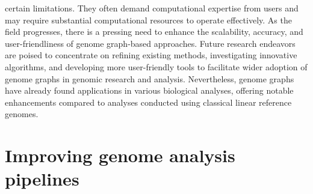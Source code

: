 \documentclass[a4paper, titlepage, openright]{book}
\begin{document}
certain limitations. They often demand computational expertise from users and may require substantial computational resources to operate effectively. As the field progresses, there is a pressing need to enhance the scalability, accuracy, and user-friendliness of genome graph-based approaches. Future research endeavors are poised to concentrate on refining existing methods, investigating innovative algorithms, and developing more user-friendly tools to facilitate wider adoption of genome graphs in genomic research and analysis. Nevertheless, genome graphs have already found applications in various biological analyses, offering notable enhancements compared to analyses conducted using classical linear reference genomes.

\section{Improving genome analysis pipelines}
\end{document}
